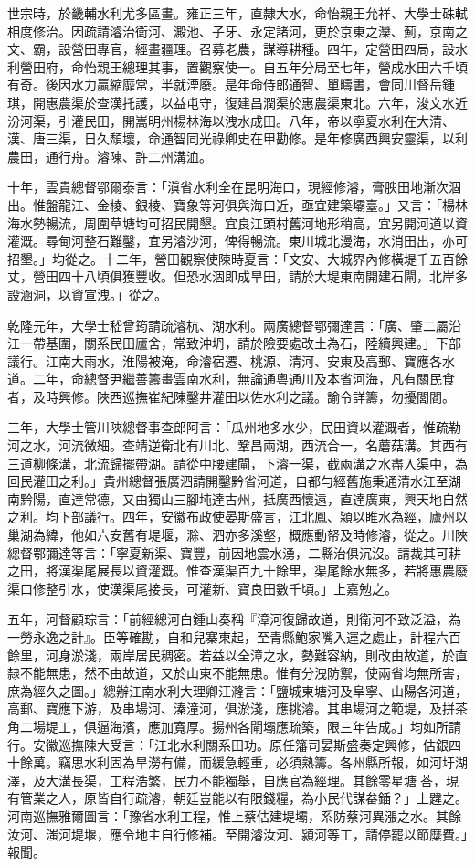 \begin{pinyinscope}
世宗時，於畿輔水利尤多區畫。雍正三年，直隸大水，命怡親王允祥、大學士硃軾相度修治。因疏請濬治衛河、澱池、子牙、永定諸河，更於京東之灤、薊，京南之文、霸，設營田專官，經畫疆理。召募老農，謀導耕種。四年，定營田四局，設水利營田府，命怡親王總理其事，置觀察使一。自五年分局至七年，營成水田六千頃有奇。後因水力贏縮靡常，半就湮廢。是年命侍郎通智、單疇書，會同川督岳鍾琪，開惠農渠於查漢托護，以益屯守，復建昌潤渠於惠農渠東北。六年，浚文水近汾河渠，引灌民田，開嵩明州楊林海以洩水成田。八年，帝以寧夏水利在大清、漢、唐三渠，日久頹壞，命通智同光祿卿史在甲勘修。是年修廣西興安靈渠，以利農田，通行舟。濬陳、許二州溝洫。

十年，雲貴總督鄂爾泰言：「滇省水利全在昆明海口，現經修濬，膏腴田地漸次涸出。惟盤龍江、金棱、銀棱、寶象等河俱與海口近，亟宜建築壩臺。」又言：「楊林海水勢暢流，周圍草塘均可招民開墾。宜良江頭村舊河地形稍高，宜另開河道以資灌溉。尋甸河整石難鑿，宜另濬沙河，俾得暢流。東川城北漫海，水消田出，亦可招墾。」均從之。十二年，營田觀察使陳時夏言：「文安、大城界內修橫堤千五百餘丈，營田四十八頃俱獲豐收。但恐水涸即成旱田，請於大堤東南開建石閘，北岸多設涵洞，以資宣洩。」從之。

乾隆元年，大學士嵇曾筠請疏濬杭、湖水利。兩廣總督鄂彌達言：「廣、肇二屬沿江一帶基圍，關系民田廬舍，常致沖坍，請於險要處改土為石，陸續興建。」下部議行。江南大雨水，淮陽被淹，命濬宿遷、桃源、清河、安東及高郵、寶應各水道。二年，命總督尹繼善籌畫雲南水利，無論通粵通川及本省河海，凡有關民食者，及時興修。陜西巡撫崔紀陳鑿井灌田以佐水利之議。諭令詳籌，勿擾閭閻。

三年，大學士管川陜總督事查郎阿言：「瓜州地多水少，民田資以灌溉者，惟疏勒河之水，河流微細。查靖逆衛北有川北、鞏昌兩湖，西流合一，名蘑菇溝。其西有三道柳條溝，北流歸擺帶湖。請從中腰建閘，下濬一渠，截兩溝之水盡入渠中，為回民灌田之利。」貴州總督張廣泗請開鑿黔省河道，自都勻經舊施秉通清水江至湖南黔陽，直達常德，又由獨山三腳坉達古州，抵廣西懷遠，直達廣東，興天地自然之利。均下部議行。四年，安徽布政使晏斯盛言，江北鳳、潁以睢水為經，廬州以巢湖為緯，他如六安舊有堤堰，滁、泗亦多溪壑，概應動帑及時修濬，從之。川陜總督鄂彌達等言：「寧夏新渠、寶豐，前因地震水湧，二縣治俱沉沒。請裁其可耕之田，將漢渠尾展長以資灌溉。惟查漢渠百九十餘里，渠尾餘水無多，若將惠農廢渠口修整引水，使漢渠尾接長，可灌新、寶良田數千頃。」上嘉勉之。

五年，河督顧琮言：「前經總河白鍾山奏稱『漳河復歸故道，則衛河不致泛溢，為一勞永逸之計』。臣等確勘，自和兒寨東起，至青縣鮑家嘴入運之處止，計程六百餘里，河身淤淺，兩岸居民稠密。若益以全漳之水，勢難容納，則改由故道，於直隸不能無患，然不由故道，又於山東不能無患。惟有分洩防禦，使兩省均無所害，庶為經久之圖。」總辦江南水利大理卿汪漋言：「鹽城東塘河及阜寧、山陽各河道，高郵、寶應下游，及串場河、溱潼河，俱淤淺，應挑濬。其串場河之範堤，及拼茶角二場堤工，俱逼海濱，應加寬厚。揚州各閘壩應疏築，限三年告成。」均如所請行。安徽巡撫陳大受言：「江北水利關系田功。原任籓司晏斯盛奏定興修，估銀四十餘萬。竊思水利固為旱澇有備，而緩急輕重，必須熟籌。各州縣所報，如河圩湖澤，及大溝長渠，工程浩繁，民力不能獨舉，自應官為經理。其餘零星塘荅，現有管業之人，原皆自行疏濬，朝廷豈能以有限錢糧，為小民代謀畚鍤？」上韙之。河南巡撫雅爾圖言：「豫省水利工程，惟上蔡估建堤壩，系防蔡河異漲之水。其餘汝河、滍河堤堰，應令地主自行修補。至開濬汝河、潁河等工，請停罷以節糜費。」報聞。


\end{pinyinscope}
